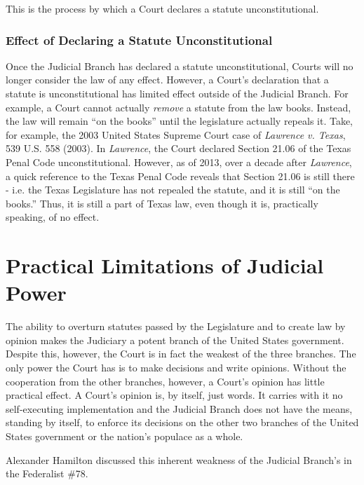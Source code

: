 This is the process by which a Court declares a statute unconstitutional.


\subsubsection{Effect of Declaring a Statute Unconstitutional}

Once the Judicial Branch has declared a statute unconstitutional, Courts will no longer consider the law of any effect.  However, a Court's declaration that a statute is unconstitutional has limited effect outside of the Judicial Branch.  For example, a Court cannot actually \textit{remove} a statute from the law books.  Instead, the law will remain ``on the books'' until the legislature actually repeals it.  Take, for example, the 2003 United States Supreme Court case of \textit{Lawrence v. Texas}, 539 U.S. 558 (2003).  In \textit{Lawrence}, the Court declared Section 21.06 of the Texas Penal Code unconstitutional.  However, as of 2013, over a decade after \textit{Lawrence}, a quick reference to the Texas Penal Code reveals that Section 21.06 is still there - i.e. the Texas Legislature has not repealed the statute, and it is still ``on the books.''  Thus, it is still a part of Texas law, even though it is, practically speaking, of no effect.



\section{Practical Limitations of Judicial Power}

The ability to overturn statutes passed by the Legislature and to create law by opinion makes the Judiciary a potent branch of the United States government.  Despite this, however, the Court is in fact the weakest of the three branches.  The only power the Court has is to make decisions and write opinions.  Without the cooperation from the other branches, however, a Court's opinion has little practical effect.  A Court's opinion is, by itself, just words.  It carries with it no self-executing implementation and the Judicial Branch does not have the means, standing by itself, to enforce its decisions on the other two branches of the United States government or the nation's populace as a whole.

Alexander Hamilton discussed this inherent weakness of the Judicial Branch's in the Federalist \#78.


